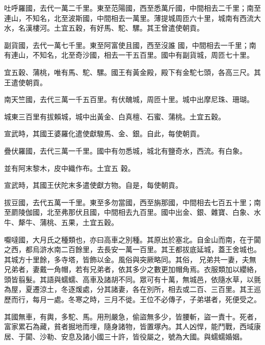 \begin{pinyinscope}
 吐呼羅國，去代一萬二千里。東至范陽國，西至悉萬斤國，中間相去二千里；南至連山，不知名，北至波斯國，中間相去一萬里。薄提城周匝六十里，城南有西流大水，名漢樓河。土宜五穀，有好馬、駝、騾。其王曾遣使朝貢。



 副貨國，去代一萬七千里。東至阿富使且國，西至沒誰
 國，中間相去一千里；南有連山，不知名，北至奇沙國，相去一干五百里。國中有副貨城，周匝七十里。



 宜五穀、蒲桃，唯有馬、駝、騾。國王有黃金殿，殿下有金駝七頭，各高三尺。其王遣使朝貢。



 南天竺國，去代三萬一千五百里。有伏醜城，周匝十里。城中出摩尼珠、珊瑚。



 城東三百里有拔賴城，城中出黃金、白真檀、石蜜、蒲桃。土宜五穀。



 宣武時，其國王婆羅化遣使獻駿馬、金、銀。自此，每使朝貢。



 疊伏羅國，去代三萬一千里。國中有勿悉城，城北有鹽奇水，西流。有白象。



 並有阿末黎木，皮中織作布。土宜五
 穀。



 宣武時，其國王伏陀末多遣使獻方物。自是，每使朝貢。



 拔豆國，去代五萬一千里。東至多勿當國，西至旃那國，中間相去七百五十里；南至罽陵伽國，北至弗那伏且國，中間相去九百里。國中出金、銀、雜寶、白象、水牛、犛牛、蒲桃、五果，土宜五穀。



 嚈噠國，大月氏之種類也，亦曰高車之別種。其原出於塞北。自金山而南，在于闐之西，都烏滸水南二百餘里，去長安一萬一百里。其王都拔底延城，蓋王舍城也。其城方十里餘，多寺塔，皆飾以金。風俗與突厥略同。其俗，
 兄弟共一妻，夫無兄弟者，妻戴一角帽，若有兄弟者，依其多少之數更加帽角焉。衣服類加以纓絡，頭皆翦髮。其語與蠕蠕、高車及諸胡不同。眾可有十萬，無城邑，依隨水草，以氈為屋，夏遷涼土，冬逐煖處，分其諸妻，各在別所，相去或二百、三百里。其王巡歷而行，每月一處。冬寒之時，三月不徙。王位不必傳子，子弟堪者，死便受之。



 其國無車，有輿，多駝、馬。用刑嚴急，偷盜無多少，皆腰斬，盜一責十。死者，富家累石為藏，貧者掘地而埋，隨身諸物，皆置塚內。其人凶悍，能鬥戰，西域康居、于闐、沙勒、安息及諸小國三十許，皆役屬之，號為大國。與蠕蠕婚姻。




\end{pinyinscope}
